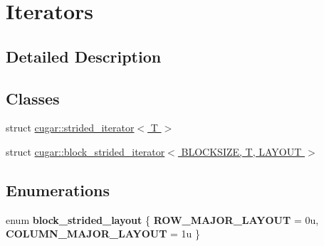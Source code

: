 \hypertarget{group___iterators}{}\section{Iterators}
\label{group___iterators}


\subsection{Detailed Description}
\subsection*{Classes}
\begin{DoxyCompactItemize}
\item 
struct \hyperlink{structcugar_1_1strided__iterator}{cugar\+::strided\+\_\+iterator$<$ T $>$}
\item 
struct \hyperlink{structcugar_1_1block__strided__iterator}{cugar\+::block\+\_\+strided\+\_\+iterator$<$ B\+L\+O\+C\+K\+S\+I\+Z\+E, T, L\+A\+Y\+O\+U\+T $>$}
\end{DoxyCompactItemize}
\subsection*{Enumerations}
\begin{DoxyCompactItemize}
\item 
\mbox{\label{group___iterators_ga3d26fe53e476a0d79cd2f2e23310ea32}} 
enum {\bfseries block\+\_\+strided\+\_\+layout} \{ {\bfseries R\+O\+W\+\_\+\+M\+A\+J\+O\+R\+\_\+\+L\+A\+Y\+O\+UT} = 0u, 
{\bfseries C\+O\+L\+U\+M\+N\+\_\+\+M\+A\+J\+O\+R\+\_\+\+L\+A\+Y\+O\+UT} = 1u
 \}
\end{DoxyCompactItemize}
